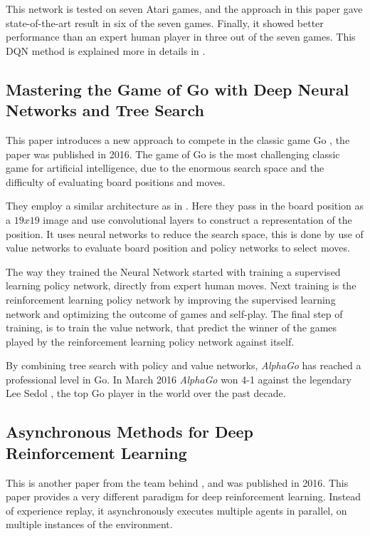 This network is tested on seven Atari games, and the approach in this paper gave state-of-the-art result in six of the seven games. Finally, it showed better performance than an expert human player in three out of the seven games. This DQN method is explained more in details in .  

\subsection{Mastering the Game of Go with Deep Neural Networks and Tree Search}\cite{Silver_2016}
This paper introduces a new approach to compete in the classic game Go \cite{explain_go}, the paper was published in 2016. The game of Go is the most challenging classic game for artificial intelligence, due to the enormous search space and the difficulty of evaluating board positions and moves. 

They employ a similar architecture as in \cite{DBLP:journals/corr/MnihKSGAWR13}. Here they pass in the board position as a $19 x 19$ image and use convolutional layers to construct a representation of the position. It uses neural networks to reduce the search space, this is done by use of value networks to evaluate board position and policy networks to select moves.

The way they trained the Neural Network started with training a supervised learning policy network, directly from expert human moves. Next training is the reinforcement learning policy network by improving the supervised learning network and optimizing the outcome of games and self-play. The final step of training, is to train the value network, that predict the winner of the games played by the reinforcement learning policy network against itself.   

By combining tree search with policy and value networks, \textit{AlphaGo} has reached a professional level in Go. In March 2016 \textit{AlphaGo} won 4-1 against the legendary Lee Sedol , the top Go player in the world over the past decade.  

\subsection{Asynchronous Methods for Deep Reinforcement Learning}\label{AsyncMeths}\cite{DBLP:journals/corr/MnihBMGLHSK16}
This is another paper from the team behind \cite{DBLP:journals/corr/MnihKSGAWR13}, and was published in 2016. This paper provides a very different paradigm for deep reinforcement learning. Instead of experience replay, it asynchronously executes multiple agents in parallel, on multiple instances of the environment. 


